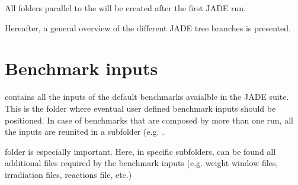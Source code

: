 \documentclass[letterpaper,10pt,english]{sphinxmanual}
\begin{document}
All folders parallel to the  will be created after the first JADE run.

Hereafter, a general overview of the different JADE tree branches is presented.


\section{Benchmark inputs}
\label{\detokenize{usage/folders:benchmark-inputs}}
 contains all the inputs of the default benchmarks avaialble in the JADE suite.
This is the folder where eventual user defined benchmark inputs should be positioned.
In case of benchmarks that are composed by more than one run, all the inputs are reunited in a sub\sphinxhyphen{}folder
(e.g. .

 folder is especially important. Here, in specific subfolders, can be found
all additional files required by the benchmark inputs (e.g. weight window files, irradiation files, reactions file,
etc.)
\end{document}

